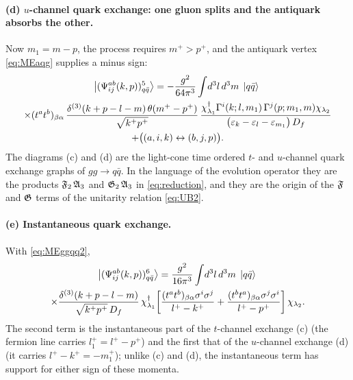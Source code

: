 \paragraph{(d) $u$-channel quark exchange: one gluon splits and the antiquark absorbs the other.}
Now $m_{1}=m-p$, the process requires $m^{+}>p^{+}$, and the antiquark vertex \eqref{eq:MEaqg}
supplies a minus sign:
\begin{multline}
\left|(\Psi^{ab}_{ij}(k,p))^{5}_{q\bar q}\right\rangle=-\frac{g^{2}}{64\pi^{3}}\int\!d^{3}l\,d^{3}m\;\left|q\bar q\right\rangle\;\\
\times(t^{a}t^{b})_{\beta\alpha}\,
\frac{\delta^{(3)}(k+p-l-m)\,\theta(m^{+}-p^{+})}{\sqrt{k^{+}p^{+}}}\,
\frac{\chi^{\dagger}_{\lambda_{1}}\Gamma^{i}(k;l,m_{1})\,\Gamma^{j}(p;m_{1},m)\chi_{\lambda_{2}}}
{\big(\varepsilon_{k}-\varepsilon_{l}-\varepsilon_{m_{1}}\big)\,D_{f}}\\
+\big((a,i,k)\leftrightarrow(b,j,p)\big).
\label{eq:B1d}
\end{multline}
The diagrams (c) and (d) are the light-cone time ordered $t$- and $u$-channel quark exchange
graphs of $gg\to q\bar q$. In the language of the evolution operator they are the products
$\mathfrak{F}_{2}\,\mathfrak{A}_{3}$ and $\mathfrak{G}_{2}\,\mathfrak{A}_{3}$ in \eqref{eq:reduction}, and they are the origin of
the $\mathfrak{F}$ and $\mathfrak{G}$ terms of the unitarity relation \eqref{eq:UB2}.

\paragraph{(e) Instantaneous quark exchange.}
\begin{center}
\end{center}
With \eqref{eq:MEggqq2},
\begin{multline}
\left|(\Psi^{ab}_{ij}(k,p))^{6}_{q\bar q}\right\rangle=\frac{g^{2}}{16\pi^{3}}\int\!d^{3}l\,d^{3}m\;\left|q\bar q\right\rangle\,
\\
\times\frac{\delta^{(3)}(k+p-l-m)}{\sqrt{k^{+}p^{+}}\,D_{f}}\,
\chi^{\dagger}_{\lambda_{1}}\!\left[\frac{(t^{a}t^{b})_{\beta\alpha}\sigma^{i}\sigma^{j}}{l^{+}-k^{+}}
+\frac{(t^{b}t^{a})_{\beta\alpha}\sigma^{j}\sigma^{i}}{l^{+}-p^{+}}\right]\chi_{\lambda_{2}} .
\label{eq:B1e}
\end{multline}
The second term is the instantaneous part of the $t$-channel exchange (c) (the fermion line
carries $l_{1}^{+}=l^{+}-p^{+}$) and the first that of the $u$-channel exchange (d) (it carries
$l^{+}-k^{+}=-m_{1}^{+}$); unlike (c) and (d), the instantaneous term has support for either sign
of these momenta.

